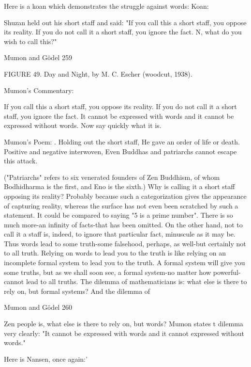 Here is a koan which demonstrates the struggle against words:
Koan:

Shuzan held out his short staff and said: "If you call this a short staff, you oppose its
reality. If you do not call it a short staff, you ignore the fact. N, what do you wish to call
this?"




Mumon and Gödel                                                                           259

              FIGURE 49. Day and Night, by M. C. Escher (woodcut, 1938).

Mumon's Commentary:

If you call this a short staff, you oppose its reality. If you do not call it a short staff, you
ignore the fact. It cannot be expressed with words and it cannot be expressed without
words. Now say quickly what it is.

Mumon's Poem:
.
     Holding out the short staff,
     He gave an order of life or death.
     Positive and negative interwoven,
     Even Buddhas and patriarchs cannot escape this attack.

("Patriarchs" refers to six venerated founders of Zen Buddhism, of whom Bodhidharma is
the first, and Eno is the sixth.)
         Why is calling it a short staff opposing its reality? Probably because such a
categorization gives the appearance of capturing reality, whereas the surface has not even
been scratched by such a statement. It could be compared to saying "5 is a prime
number". There is so much more-an infinity of facts-that has been omitted. On the other
hand, not to call it a staff is, indeed, to ignore that particular fact, minuscule as it may be.
Thus words lead to some truth-some falsehood, perhaps, as well-but certainly not to all
truth. Relying on words to lead you to the truth is like relying on an incomplete formal
system to lead you to the truth. A formal system will give you some truths, but as we
shall soon see, a formal system-no matter how powerful-cannot lead to all truths. The
dilemma of mathematicians is: what else is there to rely on, but formal systems? And the
dilemma of

Mumon and Gödel                                                                            260

Zen people is, what else is there to rely on, but words? Mumon states t dilemma very
clearly: "It cannot be expressed with words and it cannot
expressed without words."

      Here is Nansen, once again:'

